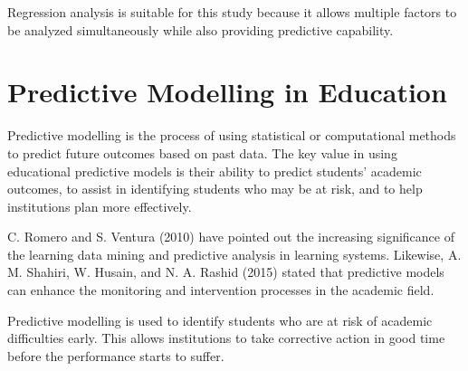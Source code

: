 \documentclass[12pt]{report}
\begin{document}
	Regression analysis is suitable for this study because it allows multiple factors to be analyzed simultaneously while also providing predictive capability.
	
	\section{Predictive Modelling in Education}
	Predictive modelling is the process of using statistical or computational methods to predict future outcomes based on past data. The key value in using educational predictive models is their ability to predict students' academic outcomes, to assist in identifying students who may be at risk, and to help institutions plan more effectively.
	
	C. Romero and S. Ventura (2010) have pointed out the increasing significance of the learning data mining and predictive analysis in learning systems. Likewise, A. M. Shahiri, W. Husain, and N. A. Rashid (2015) stated that predictive models can enhance the monitoring and intervention processes in the academic field.
	
	Predictive modelling is used to identify students who are at risk of academic difficulties early. This allows institutions to take corrective action in good time before the performance starts to suffer.
	
\end{document}
